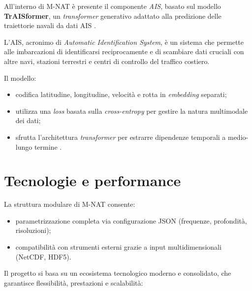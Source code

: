 All'interno di M-NAT è presente il componente \textit{AIS}, basato sul modello \textbf{TrAISformer},
un \textit{transformer} generativo adattato alla predizione delle traiettorie
navali da dati AIS \cite{nguyen2021traisformer}.

L'AIS, acronimo di \textit{Automatic Identification System}, è un sistema che permette
alle imbarcazioni di identificarsi reciprocamente e di scambiare dati cruciali con
altre navi, stazioni terrestri e centri di controllo del traffico costiero.

\noindent
Il modello:
\begin{itemize}
  \item codifica latitudine, longitudine, velocità e rotta in \textit{embedding}
    separati;

  \item utilizza una \textit{loss} basata sulla \textit{cross-entropy} per gestire
    la natura multimodale dei dati;

  \item sfrutta l'architettura \textit{transformer} per estrarre dipendenze
    temporali a medio-lungo termine \cite{nguyen2021traisformer}.
\end{itemize}

\section{Tecnologie e performance}

La struttura modulare di M-NAT consente:
\begin{itemize}
  \item parametrizzazione completa via configurazione JSON (frequenze, profondità,
    risoluzioni);

  \item compatibilità con strumenti esterni grazie a input multidimensionali (NetCDF,
    HDF5).
\end{itemize}

\noindent
Il progetto si basa su un ecosistema tecnologico moderno e consolidato, che
garantisce flessibilità, prestazioni e scalabilità:

